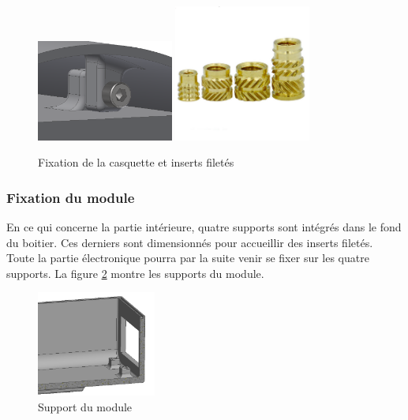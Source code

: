 \begin{figure}[H]
    \centering
    \includegraphics[width=0.4\textwidth]{Images/photos_PGA/fixcasquette.PNG}
    \includegraphics[width=0.4\textwidth]{Images/photos_PGA/inserts.jpg}
    \caption{Fixation de la casquette et inserts filetés}
    \label{fig:casquette}
\end{figure}

\subsubsection{Fixation du module}

En ce qui concerne la partie intérieure, quatre supports sont intégrés dans le fond du boitier. Ces derniers 
sont dimensionnés pour accueillir des inserts filetés. Toute la partie électronique pourra par la 
suite venir se fixer sur les quatre supports. La figure \ref{fig:fixbase} montre les supports du module.

\begin{figure}[H]
    \centering
    \includegraphics[width=0.35\textwidth]{Images/photos_PGA/fixationbaseModule.PNG}
    \caption{Support du module}
    \label{fig:fixbase}
\end{figure}

